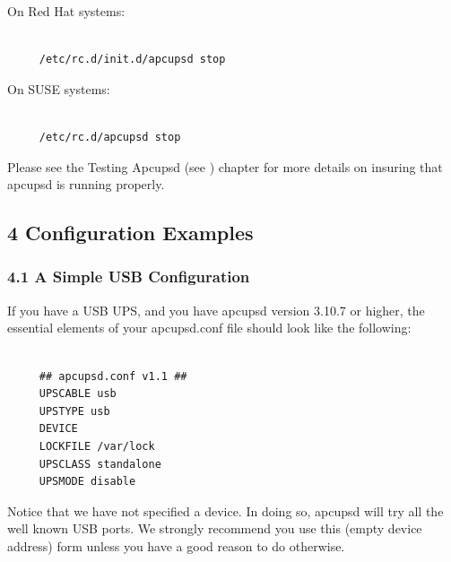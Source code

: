 On Red Hat systems: 

\footnotesize
\begin{verbatim}
     
     /etc/rc.d/init.d/apcupsd stop
\end{verbatim}
\normalsize

On SUSE systems: 

\footnotesize
\begin{verbatim}
     
     /etc/rc.d/apcupsd stop
\end{verbatim}
\normalsize

Please see the Testing Apcupsd (see 
) chapter for more details
on insuring that apcupsd is running properly. 

\label{Configuration-Examples}

\subsection*{4 Configuration Examples}

\label{index-Configuration_002c-Examples-63}
\label{index-Examples_002c-Configuration-64}

\label{A-Simple-USB-Configuration}

\subsubsection*{4.1 A Simple USB Configuration}

\label{index-Configuration_002c-USB-65}
\label{index-USB_002c-configuration-66}
\label{index-Example_002c-USB-conf-67}
If you have a USB UPS, and you have apcupsd version 3.10.7 or higher, the
essential elements of your apcupsd.conf file should look like the following: 

\footnotesize
\begin{verbatim}
     
     ## apcupsd.conf v1.1 ##
     UPSCABLE usb
     UPSTYPE usb
     DEVICE
     LOCKFILE /var/lock
     UPSCLASS standalone
     UPSMODE disable
\end{verbatim}
\normalsize

Notice that we have not specified a device. In doing so, apcupsd will try all
the well known USB ports. We strongly recommend you use this (empty device
address) form unless you have a good reason to do otherwise.  

